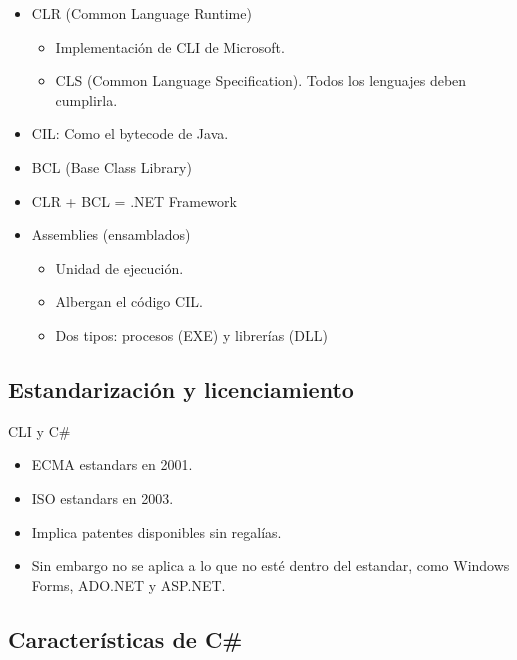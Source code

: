 \documentclass{beamer}
\begin{document}
\begin{frame}
  \begin{itemize}
    \item CLR (Common Language Runtime)
      \begin{itemize}
        \item Implementación de CLI de Microsoft.
        \item CLS (Common Language Specification). Todos los lenguajes deben
          cumplirla.
      \end{itemize}

    \item CIL: Como el bytecode de Java.
    \item BCL (Base Class Library)
    \item CLR + BCL = .NET Framework

    \item Assemblies (ensamblados)
      \begin{itemize}
        \item Unidad de ejecución.
        \item Albergan el código CIL.
        \item Dos tipos: procesos (EXE) y librerías (DLL)
      \end{itemize}
  \end{itemize}
\end{frame}


\subsection{Estandarización y licenciamiento}

\begin{frame}{CLI y C\#}
  \begin{itemize}
    \item ECMA estandars en 2001.
    \item ISO estandars en 2003.
    \item Implica patentes disponibles sin regalías.
    \item Sin embargo no se aplica a lo que no esté dentro del estandar,
      como Windows Forms, ADO.NET y ASP.NET.
  \end{itemize}
\end{frame}


\subsection{Características de C\#}
\end{document}
